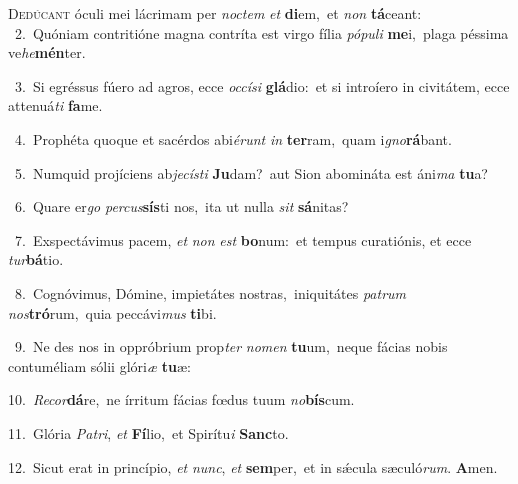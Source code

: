 \lettrine{\initial\textcolor{\initialcolor}{D}}{edúcant} óculi mei lácrimam per \textit{noc}\-\textit{tem} \textit{et} \textbf{di}\-em,~\star et \textit{non} \textbf{tá}\-ceant:\\
{\numbfont\textcolor{\numbcolor}{~2.}}~Quóniam contritióne magna contríta est virgo fília \textit{pó}\-\textit{pu}\textit{li} \textbf{me}\-i,~\star plaga péssima ve\-\textit{he}\-\textbf{mén}ter.\par
{\numbfont\textcolor{\numbcolor}{~3.}}~Si egréssus fúero ad agros, ecce \textit{oc}\-\textit{cí}\textit{si} \textbf{glá}\-dio:~\star et si introíero in civitátem, ecce attenuá\textit{ti} \textbf{fa}\-me.\par
{\numbfont\textcolor{\numbcolor}{~4.}}~Prophéta quoque et sacérdos abi\-\textit{é}\-\textit{runt} \textit{in} \textbf{ter}\-ram,~\star quam i\-\textit{gno}\-\textbf{rá}bant.\par
{\numbfont\textcolor{\numbcolor}{~5.}}~Numquid projíciens ab\-\textit{je}\-\textit{cís}\textit{ti} \textbf{Ju}\-dam?~\star aut Sion abomináta est áni\textit{ma} \textbf{tu}\-a?\par
{\numbfont\textcolor{\numbcolor}{~6.}}~Quare er\textit{go} \textit{per}\-\textit{cus}\textbf{sís}ti nos,~\star ita ut nulla \textit{sit} \textbf{sá}\-nitas?\par
{\numbfont\textcolor{\numbcolor}{~7.}}~Exspectávimus pacem, \textit{et} \textit{non} \textit{est} \textbf{bo}\-num:~\star et tempus curatiónis, et ecce \textit{tur}\-\textbf{bá}tio.\par
{\numbfont\textcolor{\numbcolor}{~8.}}~Cognóvimus, Dómine, impietátes nostras,~\dagger iniquitátes \textit{pa}\-\textit{trum} \textit{nos}\-\textbf{tró}rum,~\star quia peccávi\textit{mus} \textbf{ti}\-bi.\par
{\numbfont\textcolor{\numbcolor}{~9.}}~Ne des nos in oppróbrium prop\textit{ter} \textit{no}\-\textit{men} \textbf{tu}\-um,~\star neque fácias nobis contuméliam sólii glóri\textit{æ} \textbf{tu}\-æ:\par
{\numbfont\textcolor{\numbcolor}{10.}}~\-\textit{Re}\-\textit{cor}\textbf{dá}re,~\star ne írritum fácias fœdus tuum \textit{no}\-\textbf{bís}cum.\par
{\numbfont\textcolor{\numbcolor}{11.}}~Glória \textit{Pa}\-\textit{tri}, \textit{et} \textbf{Fí}\-lio,~\star et Spirítu\textit{i} \textbf{Sanc}\-to.\par
{\numbfont\textcolor{\numbcolor}{12.}}~Sicut erat in princípio, \textit{et} \textit{nunc}\-, \textit{et} \textbf{sem}\-per,~\star et in sǽcula sæculó\-\textit{rum}\-. \textbf{A}\-men.\par
